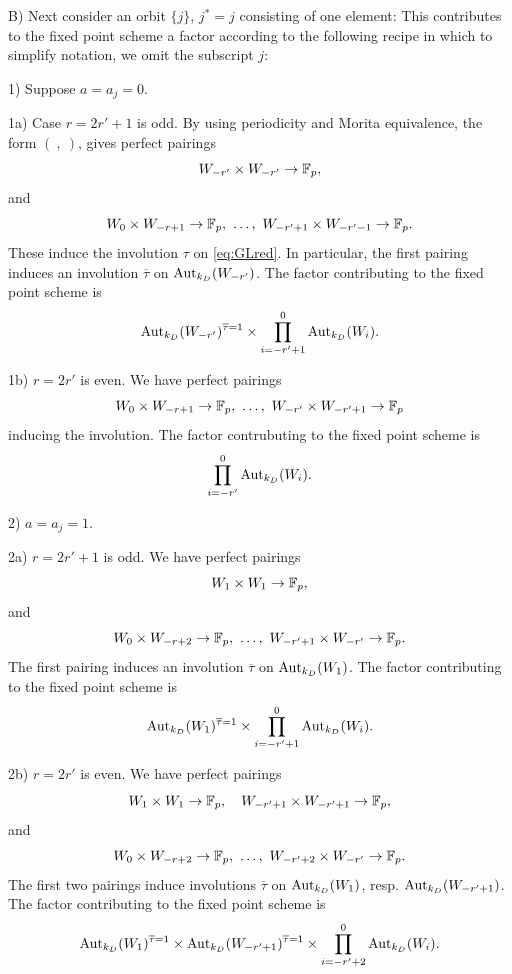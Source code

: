 \documentclass[reqno, 10pt]{amsart}
\makeatletter
\newcommand{\BF}{\ensuremath{\mathbb {F}}\xspace}
\newcommand{\ov}{\overline}
\theoremstyle{definition}
\numberwithin{equation}{subsection}
\numberwithin{subsubsection}{subsection}
\renewcommand{\to}{%
   \ifbool{@display}{\longrightarrow}{\rightarrow}%
   }
\makeatother
\begin{document}
B) Next consider an orbit $\{j\}$, $j^*=j$ consisting of one element: This contributes to the fixed point scheme  a factor according to the following recipe
in which to simplify notation, we omit the subscript $j$:

1) Suppose $a=a_j=0$. 

1a) Case $r=2r'+1$ is odd. By using periodicity and Morita equivalence, the form $(\ ,\ )$, gives perfect pairings 
\[
W_{-r'}\times W_{-r'}\to \BF_p,
\]
and
\[
W_0\times W_{-r+1}\to \BF_p,\ \ldots,\ W_{-r'+1}\times W_{-r'-1}\to \BF_p.
\]
These induce the involution $\tau$ on \eqref{eq:GLred}. In particular, the first pairing 
induces an involution $\ov\tau$ on ${\rm Aut}_{ k_{D}}(W_{-r'})$.
The factor contributing to  the fixed point scheme is 
\begin{equation}\label{Factor1a}
{\rm Aut}_{ k_{D}}(W_{-r'})^{\ov\tau=1}\times \prod_{i=-r'+1}^0 {\rm Aut}_{ k_{D}}(W_{i}).
\end{equation}

 

1b)  $r=2r'$ is even. We  have perfect pairings 
\[
W_0\times W_{-r+1}\to \BF_p,\ \ldots,\ W_{-r'}\times W_{-r'+1}\to \BF_p
\]
inducing the involution. The factor contrubuting to the fixed point scheme  is 
\begin{equation}\label{Factor1b}
  \prod_{i=-r'}^0 {\rm Aut}_{k_{D}}(W_{i}).
\end{equation}

2) $a=a_j=1$. 

2a) $r=2r'+1$ is odd. We  have perfect pairings 
\[
W_{1}\times W_{1}\to \BF_p,
\]
and
\[
W_0\times W_{-r+2}\to \BF_p,\ \ldots,\ W_{-r'+1}\times W_{-r'}\to \BF_p.
\]
The first pairing induces an involution $\ov\tau$ on ${\rm Aut}_{ k_{D}}(W_{1})$.
The factor contributing to the fixed point scheme is 
\begin{equation}\label{Factor2a}
{\rm Aut}_{ k_{D}}(W_{1})^{\ov\tau=1}\times \prod_{i=-r'+1}^0 {\rm Aut}_{ k_{D}}(W_{i}).
\end{equation}

2b) $r=2r'$ is even. We  have perfect pairings
\[
W_{1}\times W_{1}\to \BF_p,\quad W_{-r'+1}\times W_{-r'+1}\to \BF_p,
\]
and
\[
W_0\times W_{-r+2}\to \BF_p,\ \ldots,\ W_{-r'+2}\times W_{-r'}\to \BF_p.
\]
The first two pairings induce  involutions $\ov\tau$ on ${\rm Aut}_{ k_{D}}(W_{1})$, resp.  ${\rm Aut}_{ k_{D}}(W_{-r'+1})$. 
The factor contributing  to the fixed point scheme is 
\begin{equation}\label{Factor2b}
{\rm Aut}_{ k_{D}}(W_{1})^{\ov\tau=1}\times {\rm Aut}_{ k_{D}}(W_{-r'+1})^{\ov\tau=1}\times \prod_{i=-r'+2}^0 {\rm Aut}_{ k_{D}}(W_{i}).
\end{equation}
\end{document}
